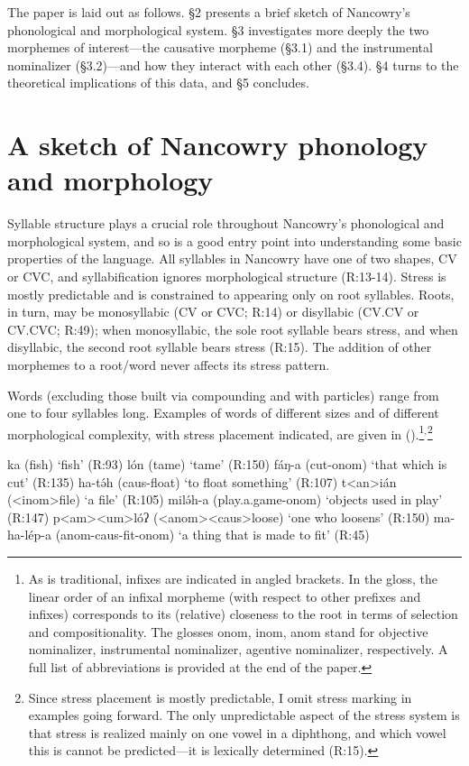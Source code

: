\documentclass[output=paper,colorlinks,citecolor=brown,
]{langscibook}
\newcounter{nexttmp}    %
\newcommand{\Next}{\setcounter{nexttmp}{\value{equation}}\stepcounter{nexttmp}(\thenexttmp)\xspace}
\begin{document}
The paper is laid out as follows. \S2 presents a brief sketch of Nancowry's phonological and morphological system. \S3 investigates more deeply the two morphemes of interest---the causative morpheme (\S3.1) and the instrumental nominalizer (\S3.2)---and how they interact with each other (\S3.4). \S4 turns to the theoretical implications of this data, and \S5 concludes.

\section{A sketch of Nancowry phonology and morphology}

Syllable structure plays a crucial role throughout Nancowry's phonological and morphological system, and so is a good entry point into understanding some basic properties of the language. All syllables in Nancowry have one of two shapes, CV or CVC, and syllabification ignores morphological structure (R:13-14). Stress is mostly predictable and is constrained to appearing only on root syllables. Roots, in turn, may be monosyllabic (CV or CVC; R:14) or disyllabic (CV.CV or CV.CVC; R:49); when monosyllabic, the sole root syllable bears stress, and when disyllabic, the second root syllable bears stress (R:15). The addition of other morphemes to a root/word never affects its stress pattern. 

Words (excluding those built via compounding and with particles) range from one to four syllables long. Examples of words of different sizes and of different morphological complexity, with stress placement indicated, are given in \Next.\footnote{As is traditional, infixes are indicated in angled brackets. In the gloss, the linear order of an infixal morpheme (with respect to other prefixes and infixes) corresponds to its (relative) closeness to the root in terms of selection and compositionality. The glosses {\sc onom, inom, anom} stand for objective nominalizer, instrumental nominalizer, agentive nominalizer, respectively. A full list of abbreviations is provided at the end of the paper.}$^{,}$\footnote{Since stress placement is mostly predictable, I omit stress marking in examples going forward. The only unpredictable aspect of the stress system is that stress is realized mainly on one vowel in a diphthong, and which vowel this is cannot be predicted---it is lexically determined (R:15).}

\ea \label{kalinone}
\ea ka (fish) \hfill `fish' (R:93)
\ex l\'on (tame) \hfill `tame' (R:150)
\ex f\'aŋ-a (cut-{\sc onom}) \hfill `that which is cut' (R:135)
\ex ha-t\'əh ({\sc caus}-float) \hfill `to float something' (R:107)
\ex t<an>i\'an ({\sc <inom>}file) \hfill `a file'  (R:105)
\ex mil\'əh-a (play.a.game-{\sc onom}) \hfill `objects used in play' (R:147)
\ex p<am><um>l\'oʔ ({\sc <anom><caus>}loose) \hfill `one who loosens' (R:150)
\ex ma-ha-l\'ep-a ({\sc anom-caus}-fit-{\sc onom}) \hfill `a thing that is made to fit'  (R:45)
\z
\z
\end{document}
